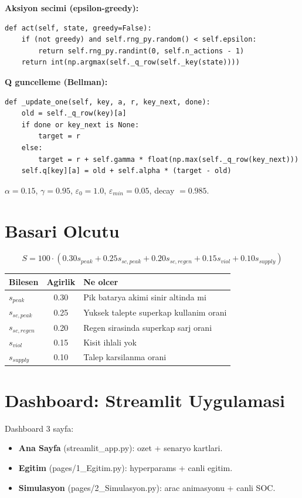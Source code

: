 \documentclass[11pt,a4paper]{article}
\begin{document}
\textbf{Aksiyon secimi (epsilon-greedy):}
\begin{lstlisting}[style=py]
def act(self, state, greedy=False):
    if (not greedy) and self.rng_py.random() < self.epsilon:
        return self.rng_py.randint(0, self.n_actions - 1)
    return int(np.argmax(self._q_row(self._key(state))))
\end{lstlisting}

\textbf{Q guncelleme (Bellman):}
\begin{lstlisting}[style=py]
def _update_one(self, key, a, r, key_next, done):
    old = self._q_row(key)[a]
    if done or key_next is None:
        target = r
    else:
        target = r + self.gamma * float(np.max(self._q_row(key_next)))
    self.q[key][a] = old + self.alpha * (target - old)
\end{lstlisting}

$\alpha = 0.15$, $\gamma = 0.95$, $\varepsilon_0 = 1.0$, $\varepsilon_{min} = 0.05$, decay $= 0.985$.

\section{Basari Olcutu}

\[
S = 100 \cdot (0.30 s_{peak} + 0.25 s_{sc,peak} + 0.20 s_{sc,regen} + 0.15 s_{viol} + 0.10 s_{supply})
\]

\begin{center}
\begin{tabular}{lcp{7cm}}
\toprule
Bilesen & Agirlik & Ne olcer \\
\midrule
$s_{peak}$ & 0.30 & Pik batarya akimi sinir altinda mi \\
$s_{sc,peak}$ & 0.25 & Yuksek talepte superkap kullanim orani \\
$s_{sc,regen}$ & 0.20 & Regen sirasinda superkap sarj orani \\
$s_{viol}$ & 0.15 & Kisit ihlali yok \\
$s_{supply}$ & 0.10 & Talep karsilanma orani \\
\bottomrule
\end{tabular}
\end{center}

\section{Dashboard: Streamlit Uygulamasi}

Dashboard 3 sayfa:
\begin{itemize}
  \item \textbf{Ana Sayfa} (streamlit\_app.py): ozet + senaryo kartlari.
  \item \textbf{Egitim} (pages/1\_Egitim.py): hyperparams + canli egitim.
  \item \textbf{Simulasyon} (pages/2\_Simulasyon.py): arac animasyonu + canli SOC.
\end{itemize}
\end{document}
